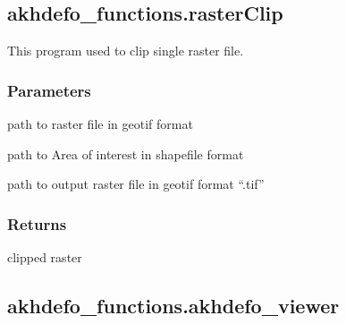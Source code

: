 \documentclass[letterpaper,10pt]{sphinxmanual}
\begin{document}
\sphinxstepscope


\subsection{akhdefo\_functions.rasterClip}
\label{\detokenize{generated/akhdefo_functions.rasterClip:akhdefo-functions-rasterclip}}\label{\detokenize{generated/akhdefo_functions.rasterClip::doc}}

\begin{fulllineitems}
\label{\detokenize{generated/akhdefo_functions.rasterClip:akhdefo_functions.rasterClip}}
\pysigstartsignatures
{}
\pysigstopsignatures
\sphinxAtStartPar
This program used to clip single raster file.


\subsubsection{Parameters}
\label{\detokenize{generated/akhdefo_functions.rasterClip:parameters}}\begin{description}
\sphinxAtStartPar
path to raster file in geotif format

\sphinxAtStartPar
path to Area of interest in shapefile format

\sphinxAtStartPar
path to output raster file in geotif format “.tif”

\end{description}


\subsubsection{Returns}
\label{\detokenize{generated/akhdefo_functions.rasterClip:returns}}
\sphinxAtStartPar
clipped raster

\end{fulllineitems}


\sphinxstepscope


\subsection{akhdefo\_functions.akhdefo\_viewer}
\label{\detokenize{generated/akhdefo_functions.akhdefo_viewer:akhdefo-functions-akhdefo-viewer}}\label{\detokenize{generated/akhdefo_functions.akhdefo_viewer::doc}}
\end{document}
